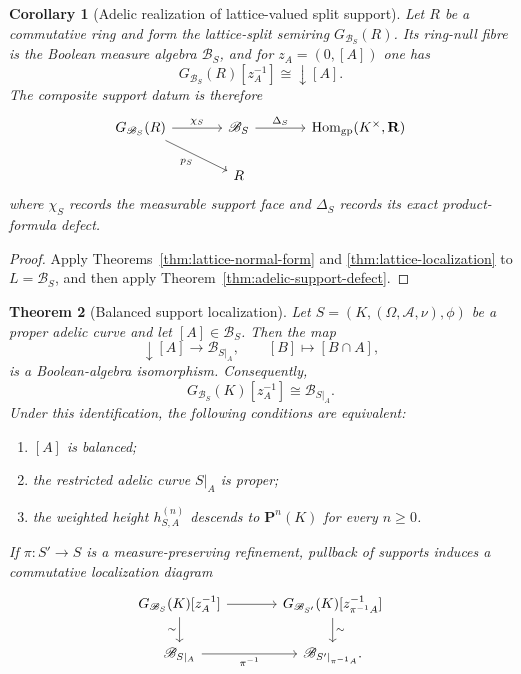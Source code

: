 \documentclass[11pt]{amsart}
\numberwithin{equation}{section}
\newtheorem{theorem}{Theorem}[section]
\newtheorem{corollary}[theorem]{Corollary}
\theoremstyle{definition}
\newcommand{\R}{\mathbf R}
\begin{document}
\begin{corollary}[Adelic realization of lattice-valued split support]
\label{cor:adelic-lattice-support}
Let $R$ be a commutative ring and form the lattice-split semiring
$G_{\mathscr B_S}(R)$.  Its ring-null fibre is the Boolean measure algebra
$\mathscr B_S$, and for $z_A=(0,[A])$ one has
\[
G_{\mathscr B_S}(R)[z_A^{-1}]\cong\downarrow[A].
\]
The composite support datum is therefore
\[
\begin{tikzcd}[column sep=large]
G_{\mathscr B_S}(R)
  \arrow[r,"\chi_S"] \arrow[dr,"p_S"']
& \mathscr B_S \arrow[r,"\Delta_S"]
& \operatorname{Hom}_{\mathrm{gp}}(K^\times,\R)\\
& R &
\end{tikzcd}
\]
where $\chi_S$ records the measurable support face and $\Delta_S$ records
its exact product-formula defect.
\end{corollary}

\begin{proof}
Apply Theorems~\ref{thm:lattice-normal-form} and
\ref{thm:lattice-localization} to $L=\mathscr B_S$, and then apply
Theorem~\ref{thm:adelic-support-defect}.
\end{proof}


\begin{theorem}[Balanced support localization]
\label{thm:balanced-support-localization}
Let $S=(K,(\Omega,\mathcal A,\nu),\phi)$ be a proper adelic curve and let
$[A]\in\mathscr B_S$.  Then the map
\[
\downarrow[A]\longrightarrow\mathscr B_{S|_A},
\qquad
[B]\longmapsto[B\cap A],
\]
is a Boolean-algebra isomorphism.  Consequently,
\[
\boxed{
G_{\mathscr B_S}(K)[z_A^{-1}]
\cong\mathscr B_{S|_A}.
}
\]
Under this identification, the following conditions are equivalent:
\begin{enumerate}[label=\textup{(\roman*)}]
\item $[A]$ is balanced;
\item the restricted adelic curve $S|_A$ is proper;
\item the weighted height $h_{S,A}^{(n)}$ descends to $\mathbf P^n(K)$ for
every $n\ge0$.
\end{enumerate}
If $\pi:S'\to S$ is a measure-preserving refinement, pullback of supports
induces a commutative localization diagram
\[
\begin{tikzcd}[column sep=large]
G_{\mathscr B_S}(K)[z_A^{-1}]
  \arrow[r] \arrow[d,"\sim"']
& G_{\mathscr B_{S'}}(K)[z_{\pi^{-1}A}^{-1}]
  \arrow[d,"\sim"]\\
\mathscr B_{S|_A} \arrow[r,"\pi^{-1}"']
& \mathscr B_{S'|_{\pi^{-1}A}}.
\end{tikzcd}
\]
\end{theorem}
\end{document}
